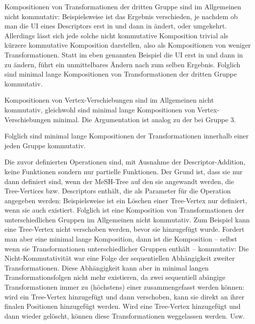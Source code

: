 Kompositionen von Transformationen der dritten Gruppe sind im Allgemeinen nicht kommutativ: Beispielsweise ist das Ergebnis verschieden, je nachdem ob man die UI eines Descriptors erst in  und dann in  ändert, oder umgekehrt. Allerdings lässt sich jede solche nicht kommutative Komposition trivial als kürzere kommutative Komposition darstellen, also als Kompositionen von weniger Transformationen. Statt im eben genannten Beispiel die UI erst in  und dann in  zu ändern, führt ein unmittelbares Ändern nach  zum selben Ergebnis. Folglich sind minimal lange Kompositionen von Transformationen der dritten Gruppe kommutativ.\par

Kompositionen von Vertex-Verschiebungen sind im Allgemeinen nicht kommutativ, gleichwohl sind minimal lange Kompositionen von Vertex-Verschiebungen minimal. Die Argumentation ist analog zu der bei Gruppe 3.  \par

Folglich sind minimal lange Kompositionen der Transformationen innerhalb einer jeden Gruppe kommutativ. \par

Die zuvor definierten Operationen sind, mit Ausnahme der Descriptor-Addition, keine Funktionen sondern nur partielle Funktionen. Der Grund ist, dass sie nur dann definiert sind, wenn der MeSH-Tree auf den sie angewandt werden, die Tree-Vertices bzw. Descriptors enthält, die als Parameter für die Operation angegeben werden: Beispielsweise ist ein Löschen einer Tree-Vertex nur definiert, wenn sie auch existiert. Folglich ist eine Komposition von Transformationen der unterschiedlichen Gruppen im Allgemeinen nicht kommutativ. Zum Beispiel kann eine Tree-Vertex nicht verschoben werden, bevor sie hinzugefügt wurde.
Fordert man aber eine minimal lange Komposition, dann ist die Komposition -- selbst wenn sie Transformationen unterschiedlicher Gruppen enthält -- kommutativ: Die Nicht-Kommutativität war eine Folge der sequentiellen Abhängigkeit zweiter Transformationen. Diese Abhängigkeit kann aber in minimal langen Transformationsfolgen nicht mehr existieren, da zwei sequentiell abängige Transformationen immer zu (höchstens) einer zusammengefasst werden können: wird ein Tree-Vertex hinzugefügt und dann verschoben, kann sie direkt an ihrer finalen Positionen hinzugefügt werden. Wird eine Tree-Vertex hinzugefügt und dann wieder gelöscht, können diese Transformationen weggelassen werden. Usw. \par

